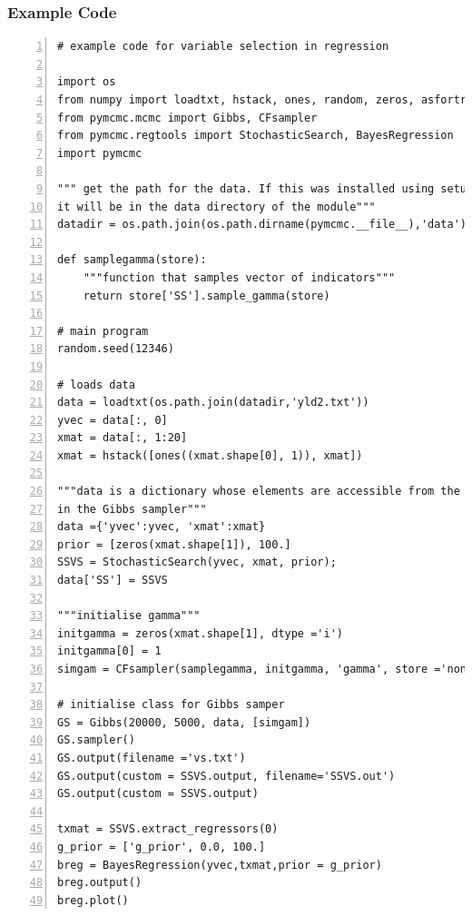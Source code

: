 \documentclass[article]{jss}
\begin{document}
\subsubsection{Example Code}


\begin{lstlisting}[basicstyle={\scriptsize},numbers=left]
# example code for variable selection in regression

import os
from numpy import loadtxt, hstack, ones, random, zeros, asfortranarray, log
from pymcmc.mcmc import Gibbs, CFsampler
from pymcmc.regtools import StochasticSearch, BayesRegression
import pymcmc

""" get the path for the data. If this was installed using setup.py
it will be in the data directory of the module"""
datadir = os.path.join(os.path.dirname(pymcmc.__file__),'data')

def samplegamma(store):
    """function that samples vector of indicators"""
    return store['SS'].sample_gamma(store)

# main program
random.seed(12346)

# loads data
data = loadtxt(os.path.join(datadir,'yld2.txt'))
yvec = data[:, 0]
xmat = data[:, 1:20]
xmat = hstack([ones((xmat.shape[0], 1)), xmat])

"""data is a dictionary whose elements are accessible from the functions
in the Gibbs sampler"""
data ={'yvec':yvec, 'xmat':xmat}
prior = [zeros(xmat.shape[1]), 100.]
SSVS = StochasticSearch(yvec, xmat, prior);
data['SS'] = SSVS

"""initialise gamma"""
initgamma = zeros(xmat.shape[1], dtype ='i')
initgamma[0] = 1
simgam = CFsampler(samplegamma, initgamma, 'gamma', store ='none')

# initialise class for Gibbs samper
GS = Gibbs(20000, 5000, data, [simgam])
GS.sampler()
GS.output(filename ='vs.txt')
GS.output(custom = SSVS.output, filename='SSVS.out')
GS.output(custom = SSVS.output)

txmat = SSVS.extract_regressors(0)
g_prior = ['g_prior', 0.0, 100.]
breg = BayesRegression(yvec,txmat,prior = g_prior)
breg.output()
breg.plot()
\end{lstlisting}
\end{document}
